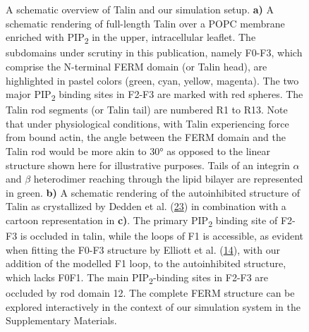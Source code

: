 \documentclass[
  twocolumn]{biophys-new-mod}
\begin{document}
\begin{figure}
\begin{minipage}[t]{0.50\linewidth}
{\centering 


}

\subcaption{\label{fig-tln-align-autoinhib}~}
\end{minipage}%

\caption{\label{fig-structure}A schematic overview of Talin and our
simulation setup. \textbf{a)} A schematic rendering of full-length Talin
over a POPC membrane enriched with PIP\textsubscript{2} in the upper,
intracellular leaflet. The subdomains under scrutiny in this
publication, namely F0-F3, which comprise the N-terminal FERM domain (or
Talin head), are highlighted in pastel colors (green, cyan, yellow,
magenta). The two major PIP\textsubscript{2} binding sites in F2-F3 are
marked with red spheres. The Talin rod segments (or Talin tail) are
numbered R1 to R13. Note that under physiological conditions, with Talin
experiencing force from bound actin, the angle between the FERM domain
and the Talin rod would be more akin to 30° as opposed to the linear
structure shown here for illustrative purposes. Tails of an integrin
\(\alpha\) and \(\beta\) heterodimer reaching through the lipid bilayer
are represented in green. \textbf{b)} A schematic rendering of the
autoinhibited structure of Talin as crystallized by Dedden et al.
(\protect\hyperlink{ref-deddenArchitectureTalin1Reveals2019a}{23}) in
combination with a cartoon representation in \textbf{c)}. The primary PIP\textsubscript{2} binding site of F2-F3 is occluded in talin, while the loops of F1 is accessible, as evident when fitting the F0-F3 structure by Elliott et al.
(\protect\hyperlink{ref-elliottStructureTalinHead2010}{14}), with our
addition of the modelled F1 loop, to the autoinhibited
structure, which lacks F0F1. The main PIP\textsubscript{2}-binding sites in
F2-F3 are occluded by rod domain 12. The complete FERM structure can be explored
interactively in the context of our simulation system in the
Supplementary Materials. }

\end{figure}
\end{document}
